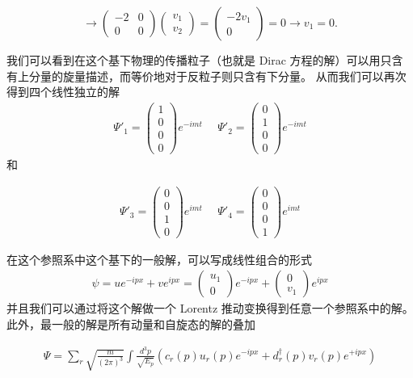 \[\rightarrow\begin{pmatrix}-2&0\\0&0\end{pmatrix}\begin{pmatrix}v_1\\v_2\end{pmatrix}=\begin{pmatrix}-2v_1\\0\end{pmatrix}=0\rightarrow v_1=0.\]

我们可以看到在这个基下物理的传播粒子（也就是 Dirac 方程的解）可以用只含有上分量的旋量描述，而等价地对于反粒子则只含有下分量。
从而我们可以再次得到四个线性独立的解
\begin{align}
\Psi'_1=\begin{pmatrix}1\\0\\0\\0\end{pmatrix}e^{-imt}~~~~~~\Psi'_2=\begin{pmatrix}0\\1\\0\\0\end{pmatrix}e^{-imt}
\end{align}
和

\begin{align}
\Psi'_3=\begin{pmatrix}0\\0\\1\\0\end{pmatrix}e^{imt}~~~~~~\Psi'_4=\begin{pmatrix}0\\0\\0\\1\end{pmatrix}e^{imt}
\end{align}

在这个参照系中这个基下的一般解，可以写成线性组合的形式
\begin{align}
\psi=ue^{-ipx}+ve^{ipx}=\begin{pmatrix}u_1\\0\end{pmatrix}e^{-ipx}+\begin{pmatrix}0\\v_1\end{pmatrix}e^{ipx}
\end{align}
并且我们可以通过将这个解做一个 Lorentz 推动变换得到任意一个参照系中的解。
此外，最一般的解是所有动量和自旋态的解的叠加

\begin{align}
\Psi=\sum_r\sqrt{\frac{m}{(2\pi)^3}}\int\frac{d^3p}{\sqrt{E_p}}\left(c_r(p)u_r(p)e^{-ipx}+d^\dagger_r(p)v_r(p)e^{+ipx}\right)
\end{align}
